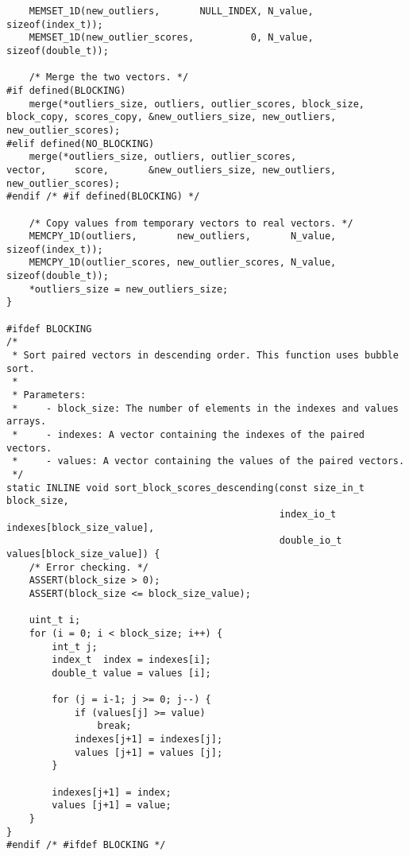 \begin{lstlisting}
    MEMSET_1D(new_outliers,       NULL_INDEX, N_value, sizeof(index_t));
    MEMSET_1D(new_outlier_scores,          0, N_value, sizeof(double_t));
    
    /* Merge the two vectors. */
#if defined(BLOCKING)
    merge(*outliers_size, outliers, outlier_scores, block_size, block_copy, scores_copy, &new_outliers_size, new_outliers, new_outlier_scores);
#elif defined(NO_BLOCKING)
    merge(*outliers_size, outliers, outlier_scores,             vector,     score,       &new_outliers_size, new_outliers, new_outlier_scores);
#endif /* #if defined(BLOCKING) */
    
    /* Copy values from temporary vectors to real vectors. */
    MEMCPY_1D(outliers,       new_outliers,       N_value, sizeof(index_t));
    MEMCPY_1D(outlier_scores, new_outlier_scores, N_value, sizeof(double_t));
    *outliers_size = new_outliers_size;
}

#ifdef BLOCKING
/*
 * Sort paired vectors in descending order. This function uses bubble sort.
 *
 * Parameters:
 *     - block_size: The number of elements in the indexes and values arrays.
 *     - indexes: A vector containing the indexes of the paired vectors.
 *     - values: A vector containing the values of the paired vectors.
 */
static INLINE void sort_block_scores_descending(const size_in_t block_size,
                                                index_io_t indexes[block_size_value],
                                                double_io_t values[block_size_value]) {
    /* Error checking. */
    ASSERT(block_size > 0);
    ASSERT(block_size <= block_size_value);
    
    uint_t i;
    for (i = 0; i < block_size; i++) {
        int_t j;
        index_t  index = indexes[i];
        double_t value = values [i];
        
        for (j = i-1; j >= 0; j--) {
            if (values[j] >= value)
                break;
            indexes[j+1] = indexes[j];
            values [j+1] = values [j];
        }
        
        indexes[j+1] = index;
        values [j+1] = value;
    }
}
#endif /* #ifdef BLOCKING */


\end{lstlisting}
